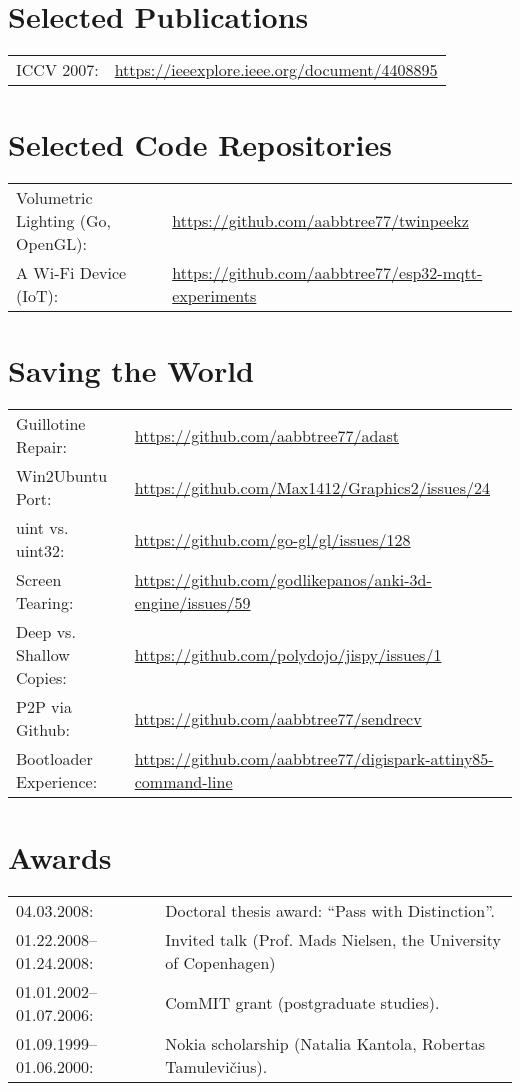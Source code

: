 \documentclass[a4paper,11pt]{article}
\begin{document}
\section*{Selected Publications}
\label{sect:pubs}

\begin{tabular}{ll}
ICCV 2007:& \url{https://ieeexplore.ieee.org/document/4408895}
\end{tabular}


%
\section*{Selected Code Repositories}
\begin{tabular}{ll}
Volumetric Lighting (Go, OpenGL): & \url{https://github.com/aabbtree77/twinpeekz}\\
A Wi-Fi Device (IoT): & \url{https://github.com/aabbtree77/esp32-mqtt-experiments}\\
\end{tabular}

%
\section*{Saving the World}
\begin{tabular}{ll}
Guillotine Repair: & \url{https://github.com/aabbtree77/adast}\\
Win2Ubuntu Port: & \url{https://github.com/Max1412/Graphics2/issues/24}\\
uint vs. uint32: & \url{https://github.com/go-gl/gl/issues/128}\\
Screen Tearing: & \url{https://github.com/godlikepanos/anki-3d-engine/issues/59}\\
Deep vs. Shallow Copies: & \url{https://github.com/polydojo/jispy/issues/1}\\
P2P via Github: & \url{https://github.com/aabbtree77/sendrecv}\\
Bootloader Experience: & \url{https://github.com/aabbtree77/digispark-attiny85-command-line}\\
\end{tabular}

%
%
\section*{Awards}
%
\begin{tabular}{ll}
        04.03.2008: & Doctoral thesis award: “Pass with Distinction”.\\
        01.22.2008--01.24.2008: & Invited talk (Prof. Mads Nielsen, the University of Copenhagen)\\
        01.01.2002--01.07.2006:& ComMIT grant (postgraduate studies).\\
        01.09.1999--01.06.2000:& Nokia scholarship (Natalia Kantola, Robertas Tamulevi\v{c}ius).
\end{tabular}
%
%

\end{document}
